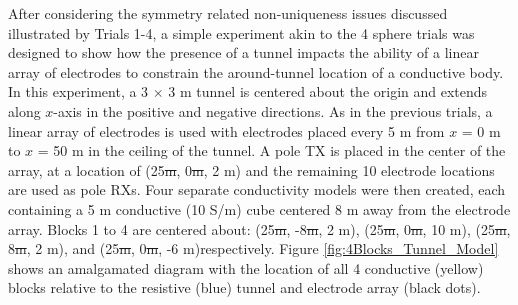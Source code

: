 \documentclass[preprint,authoryear,12pt]{elsarticle}
\providecommand{\DIFaddtex}[1]{{\protect\color{blue}\uwave{#1}}} %
\providecommand{\DIFdeltex}[1]{{\protect\color{red}\sout{#1}}}                      %
\providecommand{\DIFaddbegin}{} %
\providecommand{\DIFaddend}{} %
\providecommand{\DIFdelbegin}{} %
\providecommand{\DIFdelend}{} %
\providecommand{\DIFadd}[1]{\texorpdfstring{\DIFaddtex{#1}}{#1}} %
\providecommand{\DIFdel}[1]{\texorpdfstring{\DIFdeltex{#1}}{}} %
\begin{document}
After considering the symmetry related non-uniqueness issues discussed illustrated by Trials 1-4, a simple experiment akin to the 4 sphere trials was designed to show how the presence of a tunnel impacts the ability of a linear array of electrodes to constrain the around-tunnel location of a conductive body. In this experiment, a 3 $\times$ 3 m tunnel is centered about the origin and extends along $x$-axis in the positive and negative directions. As in the previous trials, a linear array of electrodes is used with electrodes placed every 5 m from $x$ = 0 m to $x$ = 50 m in the ceiling of the tunnel. A pole TX is placed in the center of the array, at a location of (25\DIFdelbegin \DIFdel{m}\DIFdelend , 0\DIFdelbegin \DIFdel{m}\DIFdelend , 2 m) and the remaining 10 electrode locations are used as pole RXs. Four separate conductivity models were then created, each containing a 5 m conductive (10 S/m) cube centered 8 m away from the electrode array. Blocks 1 to 4 are centered about: (25\DIFdelbegin \DIFdel{m}\DIFdelend , -8\DIFdelbegin \DIFdel{m}\DIFdelend , 2 m), (25\DIFdelbegin \DIFdel{m}\DIFdelend , 0\DIFdelbegin \DIFdel{m}\DIFdelend , 10 m), (25\DIFdelbegin \DIFdel{m}\DIFdelend , 8\DIFdelbegin \DIFdel{m}\DIFdelend , 2 m), and (25\DIFdelbegin \DIFdel{m}\DIFdelend , 0\DIFdelbegin \DIFdel{m}\DIFdelend , -6 m)\DIFaddbegin \DIFadd{, }\DIFaddend respectively. Figure \ref{fig:4Blocks_Tunnel_Model} shows an amalgamated diagram with the location of all 4 conductive (yellow) blocks relative to the resistive (blue) tunnel and electrode array (black dots).
\end{document}
